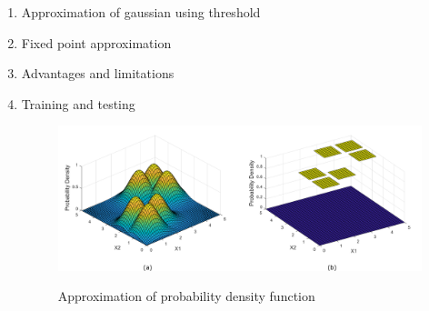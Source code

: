 \begin{enumerate}
\item Approximation of gaussian using threshold
\item Fixed point approximation
\item Advantages and limitations
\item Training and testing





\begin{figure}[t]
\centering
   \includegraphics[height=0.4\columnwidth]{Figures/pdf.pdf}
   \label{fig:pdf}
   \caption{Approximation of probability density function}
\end{figure}


\end{enumerate}
